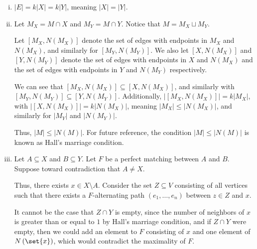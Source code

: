\documentclass[10pt]{mypackage}
\begin{document}
  \begin{solution}\hfill
    \begin{enumerate}[(i)]
      \item $|E| = k|X| = k|Y|$, meaning $|X| = |Y|$.
      \item Let $M_X = M\cap X$ and $M_Y = M\cap Y$. Notice that $M = M_X\sqcup M_Y$.\newline

        Let $\left[M_X,N\left(M_X\right)\right]$ denote the set of edges with endpoints in $M_X$ and $N\left(M_X\right)$, and similarly for $\left[M_Y,N\left(M_Y\right)\right]$. We also let $\left[X,N\left(M_X\right)\right]$ and $\left[Y,N\left(M_Y\right)\right]$ denote the set of edges with endpoints in $X$ and $N\left(M_X\right)$ and the set of edges with endpoints in $Y$ and $N\left(M_Y\right)$ respectively.\newline

        We can see that $\left[M_X,N\left(M_X\right)\right]\subseteq \left[X,N\left(M_X\right)\right]$, and similarly with $\left[M_Y,N\left(M_Y\right)\right]\subseteq \left[Y,N\left(M_Y\right)\right]$. Additionally, $\left\vert \left[M_X,N\left(M_X\right)\right] \right\vert = k\left\vert M_X \right\vert$, with $\left\vert \left[X,N\left(M_X\right)\right] \right\vert = k\left\vert N\left(M_X\right) \right\vert$, meaning $|M_X| \leq |N\left(M_X\right)|$, and similarly for $|M_Y|$ and $|N\left(M_Y\right)|$.\newline

        Thus, $|M| \leq |N(M)|$. For future reference, the condition $|M| \leq |N(M)|$ is known as Hall's marriage condition.
      \item Let $A\subseteq X$ and $B\subseteq Y$. Let $F$ be a perfect matching between $A$ and $B$. Suppose toward contradiction that $A\neq X$.\newline

        Thus, there exists $x\in X\setminus A$. Consider the set $Z\subseteq V$ consisting of all vertices such that there exists a $F$-alternating path $\left(e_1,\dots,e_n\right)$ between $z\in Z$ and $x$.\newline

        It cannot be the case that $Z\cap Y$ is empty, since the number of neighbors of $x$ is greater than or equal to $1$ by Hall's marriage condition, and if $Z\cap Y$ were empty, then we could add an element to $F$ consisting of $x$ and one element of $N\left(\set{x}\right)$, which would contradict the maximality of $F$.\newline


\end{enumerate}
\end{solution}
\end{document}
